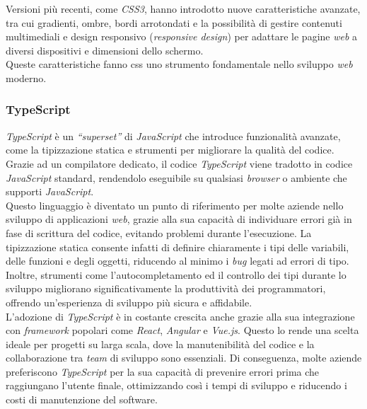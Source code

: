 \noindent Versioni più recenti, come \textit{CSS3}, hanno introdotto nuove caratteristiche avanzate, tra cui gradienti, ombre, bordi arrotondati e la possibilità di gestire contenuti multimediali
 e design responsivo (\textit{responsive design}) per adattare le pagine \textit{web} a diversi dispositivi e dimensioni dello schermo. \\
Queste caratteristiche fanno \gls{css} uno strumento fondamentale nello sviluppo \textit{web} moderno.

\pagebreak
\subsubsection{TypeScript}

\textit{TypeScript} è un \textit{“superset”} di \textit{JavaScript} che introduce funzionalità avanzate, come la tipizzazione statica e strumenti per migliorare la qualità del codice.\\
Grazie ad un compilatore dedicato, il codice \textit{TypeScript} viene tradotto in codice \textit{JavaScript} standard, rendendolo eseguibile su qualsiasi \textit{browser} o ambiente che supporti \textit{JavaScript}.\\

\noindent Questo linguaggio è diventato un punto di riferimento per molte aziende nello sviluppo di applicazioni \textit{web}, grazie alla sua capacità di individuare errori già in fase di scrittura del codice, evitando problemi durante l'esecuzione. 
La tipizzazione statica consente infatti di definire chiaramente i tipi delle variabili, delle funzioni e degli oggetti, riducendo al minimo i \textit{bug} legati ad errori di tipo. \\
Inoltre, strumenti come l’autocompletamento ed il controllo dei tipi durante lo sviluppo migliorano significativamente la produttività dei programmatori, offrendo un’esperienza di sviluppo più sicura e affidabile.\\

\noindent L’adozione di \textit{TypeScript} è in costante crescita anche grazie alla sua integrazione con \textit{framework} popolari come \textit{React}, \textit{Angular} e \textit{Vue.js}. 
Questo lo rende una scelta ideale per progetti su larga scala, dove la manutenibilità del codice e la collaborazione tra \textit{team} di sviluppo sono essenziali.
Di conseguenza, molte aziende preferiscono \textit{TypeScript} per la sua capacità di prevenire errori prima che raggiungano l'utente finale, ottimizzando così i tempi di sviluppo e riducendo i costi di manutenzione del software.\\

